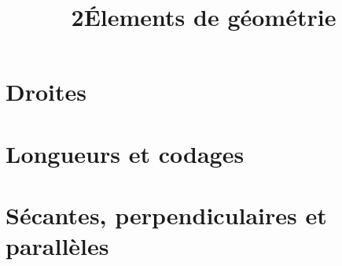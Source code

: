 \documentclass[12pt,a4paper]{article}
\date{}
\title{\textcircled{{\normalsize{2}}}\'Elements de géométrie}
\begin{document}
%
%


\maketitle



\section{Droites}



\newpage

\section{Longueurs et codages}



\section{Sécantes, perpendiculaires et parallèles}


\end{document}
